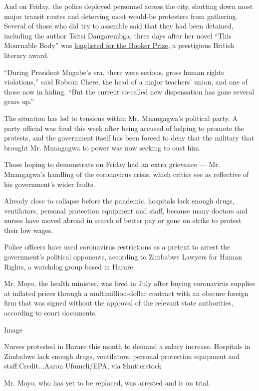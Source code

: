 And on Friday, the police deployed personnel across the city, shutting
down most major transit routes and deterring most would-be protesters
from gathering. Several of those who did try to assemble said that they
had been detained, including the author Tsitsi Dangarembga, three days
after her novel ``This Mournable Body'' was
\href{https://thebookerprizes.com/books/mournable-body-by-tsitsi-dangarembga}{longlisted
for the Booker Prize}, a prestigious British literary award.

``During President Mugabe's era, there were serious, gross human rights
violations,'' said Robson Chere, the head of a major teachers' union,
and one of those now in hiding. ``But the current so-called new
dispensation has gone several gears up.''

The situation has led to tensions within Mr. Mnangagwa's political
party. A party official was fired this week after being accused of
helping to promote the protests, and the government itself has been
forced to deny that the military that brought Mr. Mnangagwa to power was
now seeking to oust him.

Those hoping to demonstrate on Friday had an extra grievance --- Mr.
Mnangagwa's handling of the coronavirus crisis, which critics see as
reflective of his government's wider faults.

Already close to collapse before the pandemic, hospitals lack enough
drugs, ventilators, personal protection equipment and staff, because
many doctors and nurses have moved abroad in search of better pay or
gone on strike to protest their low wages.

Police officers have used coronavirus restrictions as a pretext to
arrest the government's political opponents, according to Zimbabwe
Lawyers for Human Rights, a watchdog group based in Harare.

Mr. Moyo, the health minister, was fired in July after buying
coronavirus supplies at inflated prices through a multimillion-dollar
contract with an obscure foreign firm that was signed without the
approval of the relevant state authorities, according to court
documents.

Image

Nurses protested in Harare this month to demand a salary increase.
Hospitals in Zimbabwe lack enough drugs, ventilators, personal
protection equipment and staff.Credit...Aaron Ufumeli/EPA, via
Shutterstock

Mr. Moyo, who has yet to be replaced, was arrested and is on trial.

